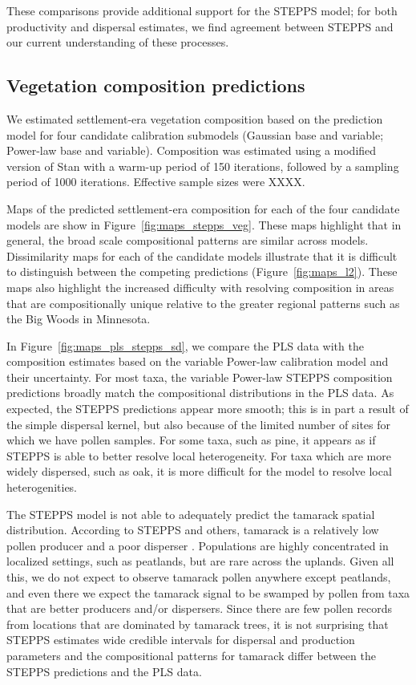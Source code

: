 \documentclass[12pt]{article}
\begin{document}
These comparisons provide additional support for the STEPPS model; for
both productivity and dispersal estimates, we find agreement between
STEPPS and our current understanding of these processes.

\subsection{Vegetation composition predictions}

We estimated settlement-era vegetation composition based on the
prediction model for four candidate calibration submodels (Gaussian
base and variable; Power-law base and variable). Composition was
estimated using a modified version of Stan with a warm-up period of
150 iterations, followed by a sampling period of 1000
iterations. Effective sample sizes were XXXX.

Maps of the predicted settlement-era composition for each of the four
candidate models are show in Figure~\ref{fig:maps_stepps_veg}. These
maps highlight that in general, the broad scale compositional patterns
are similar across models. Dissimilarity maps for each of the
candidate models illustrate that it is difficult to distinguish
between the competing predictions (Figure~\ref{fig:maps_l2}). These
maps also highlight the increased difficulty with resolving
composition in areas that are compositionally unique relative to the
greater regional patterns such as the Big Woods in Minnesota.

In Figure~\ref{fig:maps_pls_stepps_sd}, we compare the PLS data with
the composition estimates based on the variable Power-law calibration
model and their uncertainty. For most taxa, the variable Power-law
STEPPS composition predictions broadly match the compositional
distributions in the PLS data. As expected, the STEPPS predictions
appear more smooth; this is in part a result of the simple dispersal
kernel, but also because of the limited number of sites for which we
have pollen samples. For some taxa, such as pine, it appears as if
STEPPS is able to better resolve local heterogeneity. For taxa which
are more widely dispersed, such as oak, it is more difficult for the
model to resolve local heterogenities.

The STEPPS model is not able to adequately predict the tamarack
spatial distribution. According to STEPPS and others, tamarack is a
relatively low pollen producer and a poor disperser
\citep{janssen1966recent}. Populations are highly concentrated in
localized settings, such as peatlands, but are rare across the
uplands. Given all this, we do not expect to observe tamarack pollen
anywhere except peatlands, and even there we expect the tamarack
signal to be swamped by pollen from taxa that are better producers
and/or dispersers. Since there are few pollen records from locations
that are dominated by tamarack trees, it is not surprising that STEPPS
estimates wide credible intervals for dispersal and production
parameters and the compositional patterns for tamarack differ between
the STEPPS predictions and the PLS data.
\end{document}
